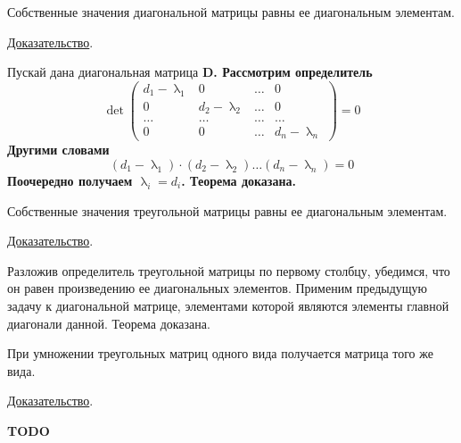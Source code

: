 \begin{theorem}
    Собственные значения диагональной матрицы равны ее диагональным элементам.

    \underline{Доказательство}.
    \vspace{5pt}

    Пускай дана диагональная матрица \bf{D}. Рассмотрим определитель
    \begin{equation*}
        \det
        \begin{pmatrix}
            d_1 - \uplambda_1 & 0                 & \dots & 0                 \\
            0                 & d_2 - \uplambda_2 & \dots & 0                 \\
            \dots             & \dots             & \dots & \dots             \\
            0                 & 0                 & \dots & d_n - \uplambda_n
        \end{pmatrix}
        = 0
    \end{equation*}
    Другими словами
    \begin{equation*}
        \left( d_1 - \uplambda_1 \right) \cdot \left( d_2 - \uplambda_2 \right) \dots \left( d_n - \uplambda_n \right) = 0
    \end{equation*}
    Поочередно получаем $\displaystyle \uplambda_i = d_i$. Теорема доказана.
\end{theorem}

\begin{theorem}
    Собственные значения треугольной матрицы равны ее диагональным элементам.

    \underline{Доказательство}.
    \vspace{5pt}

    Разложив определитель треугольной матрицы по первому столбцу, убедимся, что он равен произведению ее диагональных
    элементов. Применим предыдущую задачу к диагональной матрице, элементами которой являются элементы главной диагонали
    данной. Теорема доказана.
\end{theorem}

\begin{theorem}
    При умножении треугольных матриц одного вида получается матрица того же вида.

    \underline{Доказательство}.
    \vspace{5pt}

    \bf{TODO}
\end{theorem}

